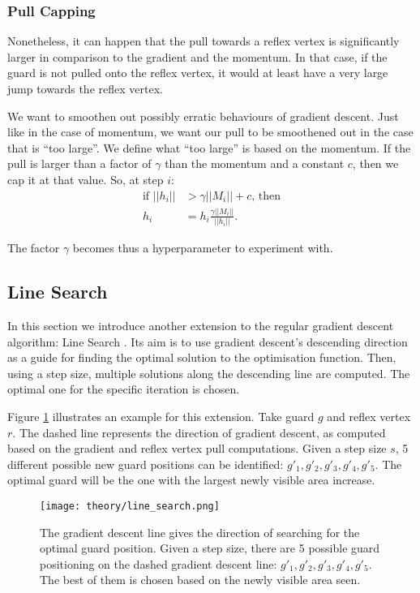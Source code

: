 \subsubsection{Pull Capping}
Nonetheless, it can happen that the pull towards a reflex vertex is significantly larger in comparison to the gradient and the momentum. In that case, if the guard is not pulled onto the reflex vertex, it would at least have a very large jump towards the reflex vertex.

We want to smoothen out possibly erratic behaviours of gradient descent. Just like in the case of momentum, we want our pull to be smoothened out in the case that is ``too large''. We define what ``too large'' is based on the momentum. If the pull is larger than a factor of $\gamma$ than the momentum and a constant $c$, then we cap it at that value. So, at step $i$:
\begin{align*}
    \text{if } ||h_i|| &> \gamma ||M_i|| + c \text{, then} \\
               h_i &= h_i \frac{\gamma ||M_i||}{||h_i||}.
\end{align*}

The factor $\gamma$ becomes thus a hyperparameter to experiment with.


\subsection{Line Search}
In this section we introduce another extension to the regular gradient descent algorithm: Line Search \cite{swann1969survey}. Its aim is to use gradient descent's descending direction as a guide for finding the optimal solution to the optimisation function. Then, using a step size, multiple solutions along the descending line are computed. The optimal one for the specific iteration is chosen.

Figure \ref{fig:line} illustrates an example for this extension. Take guard $g$ and reflex vertex $r$. The dashed line represents the direction of gradient descent, as computed based on the gradient and reflex vertex pull computations. Given a step size $s$, 5 different possible new guard positions can be identified: $g'_1, g'_2, g'_3, g'_4, g'_5$. The optimal guard will be the one with the largest newly visible area increase.

\begin{figure}[h!]
    \centering
    \texttt{[image: theory/line\_search.png]}
    \caption{The gradient descent line gives the direction of searching for the optimal guard position. Given a step size, there are 5 possible guard positioning on the dashed gradient descent line: $g'_1, g'_2, g'_3, g'_4, g'_5$. The best of them is chosen based on the newly visible area seen.}
    \label{fig:line}
\end{figure}

